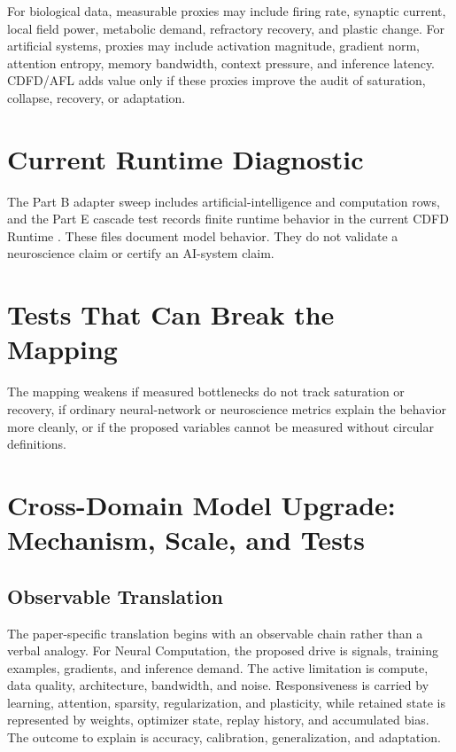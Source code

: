 \documentclass[12pt,a4paper]{article}
\begin{document}
For biological data, measurable proxies may include firing rate, synaptic
current, local field power, metabolic demand, refractory recovery, and plastic
change. For artificial systems, proxies may include activation magnitude,
gradient norm, attention entropy, memory bandwidth, context pressure, and
inference latency. CDFD/AFL adds value only if these proxies improve the audit
of saturation, collapse, recovery, or adaptation.

\section{Current Runtime Diagnostic}

The Part B adapter sweep includes artificial-intelligence and computation rows,
and the Part E cascade test records finite runtime behavior in the current CDFD
Runtime \cite{CDFDRuntime2026}. These files document model behavior. They do
not validate a neuroscience claim or certify an AI-system claim.

\section{Tests That Can Break the Mapping}

The mapping weakens if measured bottlenecks do not track saturation or recovery,
if ordinary neural-network or neuroscience metrics explain the behavior more
cleanly, or if the proposed variables cannot be measured without circular
definitions.

\section{Cross-Domain Model Upgrade: Mechanism, Scale, and Tests}

\subsection{Observable Translation}

The paper-specific translation begins with an observable chain rather than a
verbal analogy. For Neural Computation, the proposed drive is signals, training examples, gradients, and inference demand.
The active limitation is compute, data quality, architecture, bandwidth, and noise. Responsiveness is carried by
learning, attention, sparsity, regularization, and plasticity, while retained state is represented by
weights, optimizer state, replay history, and accumulated bias. The outcome to explain is accuracy, calibration, generalization, and adaptation.
\end{document}
